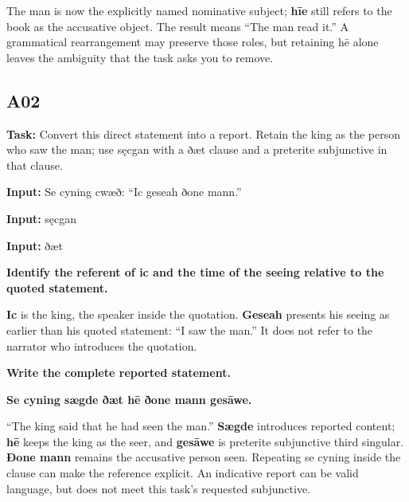 The man is now the explicitly named nominative subject; \textbf{hīe} still refers to the book as the accusative object. The result means “The man read it.” A grammatical rearrangement may preserve those roles, but retaining hē alone leaves the ambiguity that the task asks you to remove.

\subsection*{A02}

\textbf{Task:} Convert this direct statement into a report. Retain the king as the person who saw the man; use sęcgan with a ðæt clause and a preterite subjunctive in that clause.

\textbf{Input:} Se cyning cwæð: “Ic geseah ðone mann.”

\textbf{Input:} sęcgan

\textbf{Input:} ðæt

\textbf{Identify the referent of ic and the time of the seeing relative to the quoted statement.}

\textbf{Ic} is the king, the speaker inside the quotation. \textbf{Geseah} presents his seeing as earlier than his quoted statement: “I saw the man.” It does not refer to the narrator who introduces the quotation.

\par\begin{minipage}{\linewidth}\raggedright
\textbf{Write the complete reported statement.}

\textbf{Se cyning sægde ðæt hē ðone mann gesāwe.}
\end{minipage}\par

“The king said that he had seen the man.” \textbf{Sægde} introduces reported content; \textbf{hē} keeps the king as the seer, and \textbf{gesāwe} is preterite subjunctive third singular. \textbf{Ðone mann} remains the accusative person seen. Repeating se cyning inside the clause can make the reference explicit. An indicative report can be valid language, but does not meet this task’s requested subjunctive.

